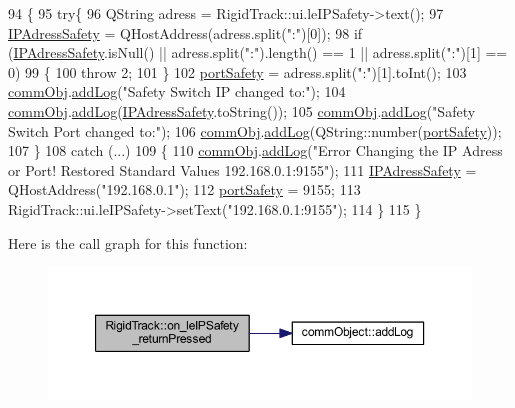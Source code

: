 \begin{DoxyCode}
94 \{
95     \textcolor{keywordflow}{try}\{
96     QString adress = RigidTrack::ui.leIPSafety->text();
97     \hyperlink{main_8cpp_afefb1102a8a4a71b55d6f24f46404cc5}{IPAdressSafety} = QHostAddress(adress.split(\textcolor{stringliteral}{":"})[0]);
98     \textcolor{keywordflow}{if} (\hyperlink{main_8cpp_afefb1102a8a4a71b55d6f24f46404cc5}{IPAdressSafety}.isNull() || adress.split(\textcolor{stringliteral}{":"}).length() == 1 || adress.split(\textcolor{stringliteral}{":"})[1] ==
       0)
99     \{
100         \textcolor{keywordflow}{throw} 2;
101     \}
102     \hyperlink{main_8cpp_a137bc8cc9d53ad9b176c988a99bc7142}{portSafety} = adress.split(\textcolor{stringliteral}{":"})[1].toInt();
103     \hyperlink{main_8cpp_af29e7fc07ae0979d5fb61b473241d33d}{commObj}.\hyperlink{classcomm_object_aec354c7099b3039083cc4224e071e022}{addLog}(\textcolor{stringliteral}{"Safety Switch IP changed to:"});
104     \hyperlink{main_8cpp_af29e7fc07ae0979d5fb61b473241d33d}{commObj}.\hyperlink{classcomm_object_aec354c7099b3039083cc4224e071e022}{addLog}(\hyperlink{main_8cpp_afefb1102a8a4a71b55d6f24f46404cc5}{IPAdressSafety}.toString());
105     \hyperlink{main_8cpp_af29e7fc07ae0979d5fb61b473241d33d}{commObj}.\hyperlink{classcomm_object_aec354c7099b3039083cc4224e071e022}{addLog}(\textcolor{stringliteral}{"Safety Switch Port changed to:"});
106     \hyperlink{main_8cpp_af29e7fc07ae0979d5fb61b473241d33d}{commObj}.\hyperlink{classcomm_object_aec354c7099b3039083cc4224e071e022}{addLog}(QString::number(\hyperlink{main_8cpp_a137bc8cc9d53ad9b176c988a99bc7142}{portSafety}));
107     \}
108     \textcolor{keywordflow}{catch} (...)
109     \{
110         \hyperlink{main_8cpp_af29e7fc07ae0979d5fb61b473241d33d}{commObj}.\hyperlink{classcomm_object_aec354c7099b3039083cc4224e071e022}{addLog}(\textcolor{stringliteral}{"Error Changing the IP Adress or Port! Restored Standard Values
       192.168.0.1:9155"});
111         \hyperlink{main_8cpp_afefb1102a8a4a71b55d6f24f46404cc5}{IPAdressSafety} = QHostAddress(\textcolor{stringliteral}{"192.168.0.1"});
112         \hyperlink{main_8cpp_a137bc8cc9d53ad9b176c988a99bc7142}{portSafety} = 9155;
113         RigidTrack::ui.leIPSafety->setText(\textcolor{stringliteral}{"192.168.0.1:9155"});
114     \}
115     \}
\end{DoxyCode}
Here is the call graph for this function\+:
\nopagebreak
\begin{figure}[H]
\begin{center}
\leavevmode
\includegraphics[width=350pt]{class_rigid_track_aa527ab3a2ddc7b31bf1063260efc9755_cgraph}
\end{center}
\end{figure}
